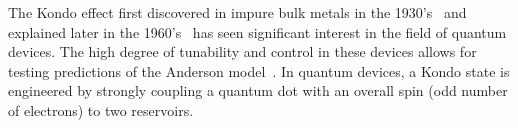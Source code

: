 The Kondo effect first discovered in impure bulk metals in the 1930’s~\cite{de_haas} and explained later in the 1960’s~\cite{jun_kondo} has seen significant interest in the field of quantum devices. The high degree of tunability and control in these devices allows for testing predictions of the Anderson model~\cite{costi_kondo_mv_eo_regime}. In quantum devices, a Kondo state is engineered by strongly coupling a quantum dot with an overall spin (odd number of electrons) to two reservoirs. 



